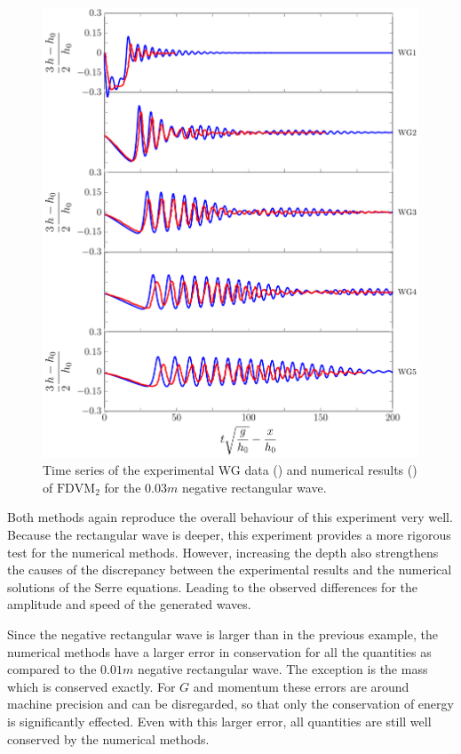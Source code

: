 \begin{figure}
	\centering
	\includegraphics[width=\textwidth]{./chp6/figures/Experiment/Segur/LongWGsFDVM3cm.pdf}
	\caption{Time series of the experimental WG data ({\color{red}\solidrule}) and numerical results ({\color{blue}\solidrule}) of $\text{FDVM}_2$ for the $0.03m$ negative rectangular wave.}
	\label{fig:Segur3cmFDVM}
\end{figure} 

Both methods again reproduce the overall behaviour of this experiment very well. Because the rectangular wave is deeper, this experiment provides a more rigorous test for the numerical methods. However, increasing the depth also strengthens the causes of the discrepancy between the experimental results and the numerical solutions of the Serre equations. Leading to the observed differences for the amplitude and speed of the generated waves.

Since the negative rectangular wave is larger than in the previous example, the numerical methods have a larger error in conservation for all the quantities as compared to the $0.01m$ negative rectangular wave. The exception is the mass which is conserved exactly. For $G$ and momentum these errors are around machine precision and can be disregarded, so that only the conservation of energy is significantly effected. Even with this larger error, all quantities are still well conserved by the numerical methods. 

